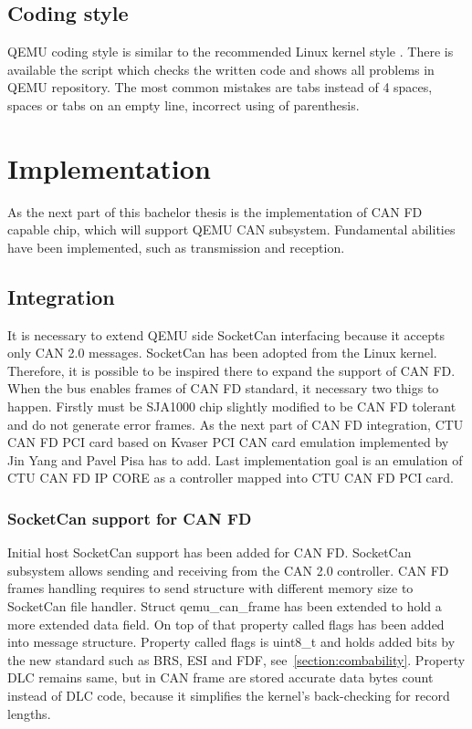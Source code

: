 \documentclass{ctuthesis}
\begin{document}
 \section{Coding style}
  QEMU coding style \cite{qemu-style} is similar to the recommended Linux kernel style \cite{linux-style}. There is available the script which checks the written code and shows all problems in QEMU repository. The most common mistakes are tabs instead of 4 spaces, spaces or tabs on an empty line, incorrect using of parenthesis.
 
\chapter{Implementation}
 As the next part of this bachelor thesis is the implementation of CAN FD capable chip, which will support QEMU CAN subsystem. Fundamental abilities have been implemented, such as transmission and reception. 
 \section{Integration}
  It is necessary to extend QEMU side SocketCan interfacing because it accepts only CAN 2.0 messages. SocketCan has been adopted from the Linux kernel. Therefore, it is possible to be inspired there to expand the support of CAN FD. When the bus enables frames of CAN FD standard, it necessary two thigs to happen. Firstly must be SJA1000 chip slightly modified to be CAN FD tolerant and do not generate error frames. As the next part of CAN FD integration, CTU CAN FD PCI card based on Kvaser PCI CAN card emulation implemented by Jin Yang and Pavel Pisa has to add. Last implementation goal is an emulation of CTU CAN FD IP CORE as a controller mapped into CTU CAN FD PCI card.
 \subsection{SocketCan support for CAN FD}
  Initial host SocketCan support has been added for CAN FD. SocketCan subsystem allows sending and receiving from the CAN 2.0 controller. CAN FD frames handling requires to send structure with different memory size to SocketCan file handler. Struct qemu\_can\_frame has been extended to hold a more extended data field. On top of that property called flags has been added into message structure. Property called flags is uint8\_t and holds added bits by the new standard such as BRS, ESI and FDF, see~\ref{section:combability}. Property DLC remains same, but in CAN frame are stored accurate data bytes count instead of DLC code, because it simplifies the kernel's back-checking for record lengths.
\end{document}
